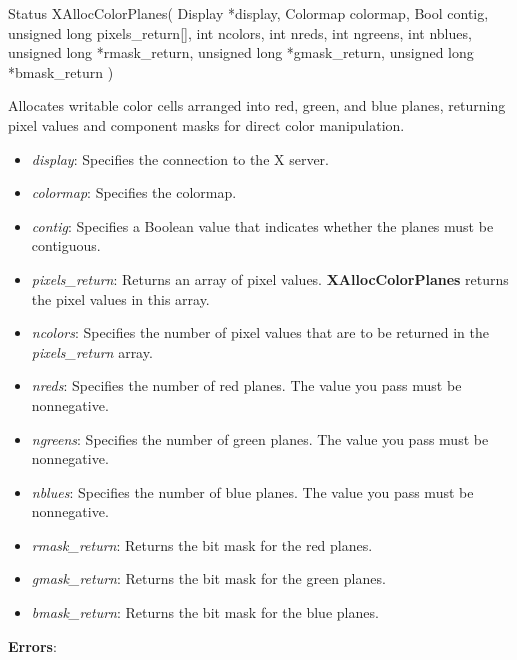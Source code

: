\documentclass{report}
\begin{document}
\begin{itemize}
            \begin{cppcode}
                Status XAllocColorPlanes(
                    Display *display,
                    Colormap colormap,
                    Bool contig,
                    unsigned long pixels_return[],
                    int ncolors,
                    int nreds,
                    int ngreens,
                    int nblues,
                    unsigned long *rmask_return,
                    unsigned long *gmask_return,
                    unsigned long *bmask_return
                )
            \end{cppcode}
            \bigbreak \noindent
            Allocates writable color cells arranged into red, green, and blue planes, returning pixel values and component masks for direct color manipulation.
            \begin{itemize}
                \item \textit{display}: Specifies the connection to the X server.
                \item \textit{colormap}: Specifies the colormap.
                \item \textit{contig}: Specifies a Boolean value that indicates whether the planes must be contiguous.
                \item \textit{pixels\_return}: Returns an array of pixel values. \textbf{XAllocColorPlanes} returns the pixel values in this array.
                \item \textit{ncolors}: Specifies the number of pixel values that are to be returned in the \textit{pixels\_return} array.
                \item \textit{nreds}: Specifies the number of red planes. The value you pass must be nonnegative.
                \item \textit{ngreens}: Specifies the number of green planes. The value you pass must be nonnegative.
                \item \textit{nblues}: Specifies the number of blue planes. The value you pass must be nonnegative.
                \item \textit{rmask\_return}: Returns the bit mask for the red planes.
                \item \textit{gmask\_return}: Returns the bit mask for the green planes.
                \item \textit{bmask\_return}: Returns the bit mask for the blue planes.
            \end{itemize}
            \bigbreak \noindent
            \textbf{Errors}:

\end{itemize}
\end{document}
